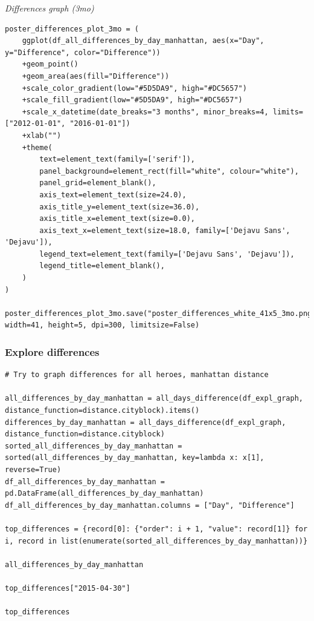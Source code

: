 \emph{Differences graph (3mo)}
\begin{verbatim}
poster_differences_plot_3mo = (
    ggplot(df_all_differences_by_day_manhattan, aes(x="Day", y="Difference", color="Difference"))
    +geom_point()
    +geom_area(aes(fill="Difference"))
    +scale_color_gradient(low="#5D5DA9", high="#DC5657")
    +scale_fill_gradient(low="#5D5DA9", high="#DC5657")
    +scale_x_datetime(date_breaks="3 months", minor_breaks=4, limits=["2012-01-01", "2016-01-01"])
    +xlab("")
    +theme(
        text=element_text(family=['serif']),
        panel_background=element_rect(fill="white", colour="white"),
        panel_grid=element_blank(),
        axis_text=element_text(size=24.0),
        axis_title_y=element_text(size=36.0),
        axis_title_x=element_text(size=0.0),
        axis_text_x=element_text(size=18.0, family=['Dejavu Sans', 'Dejavu']),
        legend_text=element_text(family=['Dejavu Sans', 'Dejavu']),
        legend_title=element_blank(),
    )
)

poster_differences_plot_3mo.save("poster_differences_white_41x5_3mo.png", width=41, height=5, dpi=300, limitsize=False)
\end{verbatim}

\subsubsection*{Explore differences}

\begin{verbatim}
# Try to graph differences for all heroes, manhattan distance

all_differences_by_day_manhattan = all_days_difference(df_expl_graph, distance_function=distance.cityblock).items()
differences_by_day_manhattan = all_days_difference(df_expl_graph, distance_function=distance.cityblock)
sorted_all_differences_by_day_manhattan = sorted(all_differences_by_day_manhattan, key=lambda x: x[1], reverse=True)
df_all_differences_by_day_manhattan = pd.DataFrame(all_differences_by_day_manhattan)
df_all_differences_by_day_manhattan.columns = ["Day", "Difference"]

top_differences = {record[0]: {"order": i + 1, "value": record[1]} for i, record in list(enumerate(sorted_all_differences_by_day_manhattan))}

all_differences_by_day_manhattan

top_differences["2015-04-30"]

top_differences
\end{verbatim}

